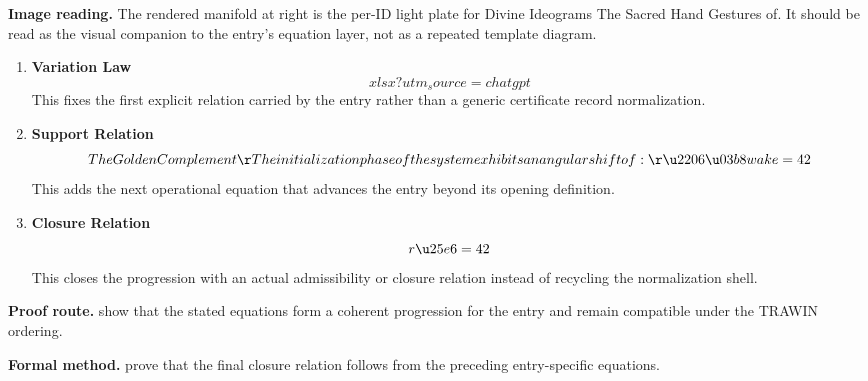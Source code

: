\begin{samepage}
\noindent\begin{minipage}[t]{0.45\linewidth}
\vspace{0pt}
\raggedright
\scriptsize\textbf{Image reading.} The rendered manifold at right is the per-ID light plate for Divine Ideograms The Sacred Hand Gestures of. It should be read as the visual companion to the entry's equation layer, not as a repeated template diagram.\par
\end{minipage}\hfill
\begin{minipage}[t]{0.53\linewidth}
\vspace*{-0.10in}
\raggedright
{}
\end{minipage}
\end{samepage}

\clearpage


\begin{enumerate}[leftmargin=1.6em,itemsep=9pt,topsep=6pt]
\item \textbf{Variation Law}
\[
xlsx?utm_source=chatgpt
\]
This fixes the first explicit relation carried by the entry rather than a generic certificate record normalization.

\item \textbf{Support Relation}
\[
The Golden Complement\r The initialization phase of the system exhibits an angular shift of:\r \u2206\u03b8wake = 42
\]
This adds the next operational equation that advances the entry beyond its opening definition.

\item \textbf{Closure Relation}
\[
r \u25e6 = 42
\]
This closes the progression with an actual admissibility or closure relation instead of recycling the normalization shell.
\end{enumerate}

\textbf{Proof route.} show that the stated equations form a coherent progression for the entry and remain compatible under the TRAWIN ordering.

\textbf{Formal method.} prove that the final closure relation follows from the preceding entry-specific equations.

\medskip
{}

